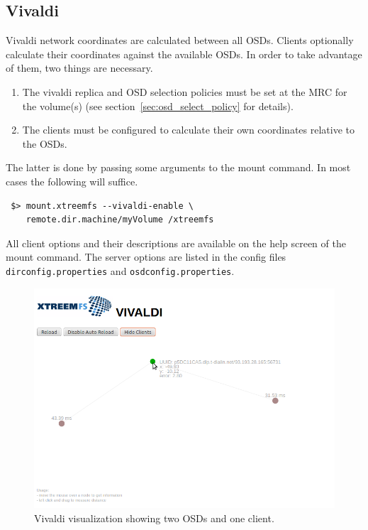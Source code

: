 \documentclass[a4paper,10pt]{book}
\begin{document}
\subsection{Vivaldi}
\label{sec:vivaldi}

Vivaldi network coordinates are calculated between all OSDs. Clients optionally calculate their coordinates against the available OSDs.
In order to take advantage of them, two things are necessary.
\begin{enumerate}
\item The vivaldi replica and OSD selection policies must be set at the MRC for the volume(s) (see section~\ref{sec:osd_select_policy} for details).
\item The clients must be configured to calculate their own coordinates relative to the OSDs.
\end{enumerate}

The latter is done by passing some arguments to the mount command. In most cases the following will suffice.
\begin{verbatim}
 $> mount.xtreemfs --vivaldi-enable \
    remote.dir.machine/myVolume /xtreemfs
\end{verbatim}

All client options and their descriptions are available on the help screen of the mount command.
The server options are listed in the config files \texttt{dirconfig.properties} and \texttt{osdconfig.properties}.

\begin{figure}[h]
 \centering
 \includegraphics[width=\linewidth]{images/screenshot_vivaldi.png}
 \caption{Vivaldi visualization showing two OSDs and one client.}
 \label{fig:screenshot_vivaldi}
\end{figure}
\end{document}
